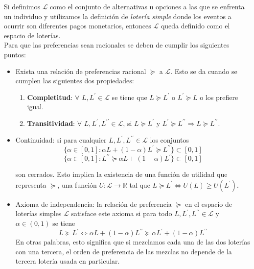 Si definimos $\mathscr{L}$ como el conjunto de alternativas u opciones a las que se enfrenta un individuo y utilizamos la definición de \textit{lotería simple} donde los eventos a ocurrir son diferentes pagos monetarios, entonces $\mathscr{L}$ queda definido como el espacio de loterías. \\

Para que las preferencias sean racionales se deben de cumplir los siguientes puntos:

\begin{itemize}
    \item Exista una relación de preferencias racional $\succeq$ a $\mathscr{L}$. Esto se da cuando se cumplen las siguientes dos propiedades:
    \begin{enumerate}
        \item \textbf{Completitud}: $\forall$ $L,L^\prime \in \mathscr{L}$ se tiene que $L \succeq L^\prime$ o $L^\prime \succeq L$ o los prefiere igual.
        
        \item \textbf{Transitividad}: $\forall$ $L,L^\prime, L^{\prime \prime} \in \mathscr{L}$, si $L \succeq L^\prime $ y $L^\prime \succeq L^{\prime \prime} \Rightarrow L \succeq L^{\prime \prime}$.
    \end{enumerate}
    
    \item Continuidad: si para cualquier $L,L^\prime, L^{\prime \prime} \in \mathscr{L}$ los conjuntos
    $$\{ \alpha \in [0,1] : \alpha L + (1-\alpha)L^{\prime} \succeq L^{\prime \prime}\} \subset [0,1]$$
    $$\{ \alpha \in [0,1] : L^{\prime \prime} \succeq \alpha L + (1- \alpha) L^\prime \} \subset [0,1]$$
    
    son cerrados. Esto implica la existencia de una función de utilidad que representa $\succeq$, una función $U: \mathscr{L} \rightarrow \mathbb{R}$ tal que $L \succeq L^\prime \Leftrightarrow U(L) \geq U(L^\prime)$.
    
    \item Axioma de independencia: la relación de preferencia $\succeq$ en el espacio de loterías simples $\mathscr{L}$ satisface este axioma si para todo $L,L^\prime, L^{\prime \prime} \in \mathscr{L}$ y $\alpha \in (0,1)$ se tiene
    $$
    L \succeq L^\prime \Leftrightarrow \alpha L + (1-\alpha)L^{\prime \prime} \succeq \alpha L^{\prime} + (1-\alpha)L^{\prime \prime}
    $$
    En otras palabras, esto significa que si mezclamos cada una de las dos loterías con una tercera, el orden de preferencia de las mezclas no depende de la tercera lotería usada en particular.
\end{itemize}

